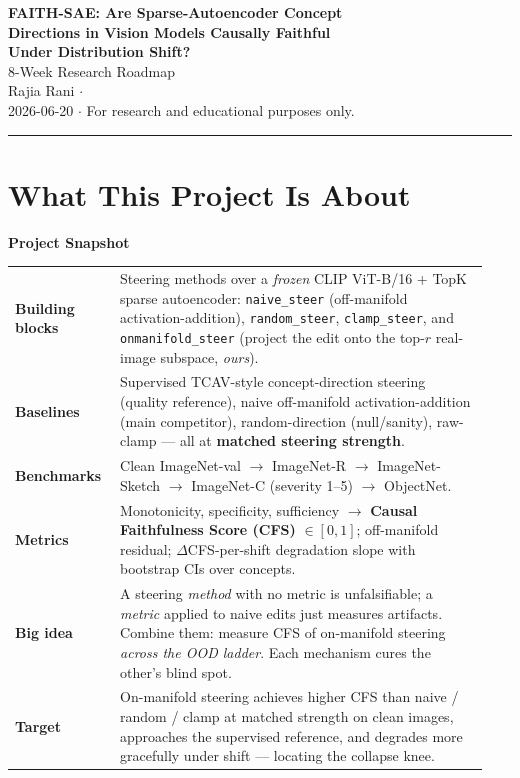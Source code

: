 \documentclass[11pt]{article}
\begin{document}
\begin{center}
  {\LARGE\bfseries\color{accent} FAITH-SAE: Are Sparse-Autoencoder Concept\\[2pt]
   Directions in Vision Models Causally Faithful\\[2pt]
   Under Distribution Shift?}\\[8pt]
  {\large 8-Week Research Roadmap}\\[5pt]
  {\normalsize Rajia Rani \;$\cdot$\; \texttt{}}\\[3pt]
  {\small 2026-06-20 \;$\cdot$\; For research and educational purposes only.}
\end{center}

\vspace{0.3em}
\hrule
\vspace{0.6em}

\section{What This Project Is About}

\begin{snapbox}
\textbf{\color{accent} Project Snapshot}\\[4pt]
\renewcommand{\arraystretch}{1.25}
\begin{tabular}{@{}>{\bfseries}p{0.20\linewidth} p{0.74\linewidth}@{}}
Building blocks &
  Steering methods over a \emph{frozen} CLIP ViT-B/16 + TopK sparse autoencoder:
  \texttt{naive\_steer} (off-manifold activation-addition), \texttt{random\_steer},
  \texttt{clamp\_steer}, and \texttt{onmanifold\_steer} (project the edit onto the
  top-$r$ real-image subspace, \emph{ours}).\\
Baselines &
  Supervised TCAV-style concept-direction steering (quality reference), naive
  off-manifold activation-addition (main competitor), random-direction (null/sanity),
  raw-clamp --- all at \textbf{matched steering strength}.\\
Benchmarks &
  Clean ImageNet-val $\rightarrow$ ImageNet-R $\rightarrow$ ImageNet-Sketch
  $\rightarrow$ ImageNet-C (severity 1--5) $\rightarrow$ ObjectNet.\\
Metrics &
  Monotonicity, specificity, sufficiency $\rightarrow$ \textbf{Causal Faithfulness
  Score (CFS)} $\in[0,1]$; off-manifold residual; $\Delta$CFS-per-shift degradation
  slope with bootstrap CIs over concepts.\\
Big idea &
  A steering \emph{method} with no metric is unfalsifiable; a \emph{metric} applied to
  naive edits just measures artifacts. Combine them: measure CFS of on-manifold
  steering \emph{across the OOD ladder}. Each mechanism cures the other's blind spot.\\
Target &
  On-manifold steering achieves higher CFS than naive / random / clamp at matched
  strength on clean images, approaches the supervised reference, and degrades more
  gracefully under shift --- locating the collapse knee.\\
\end{tabular}
\end{snapbox}
\end{document}
